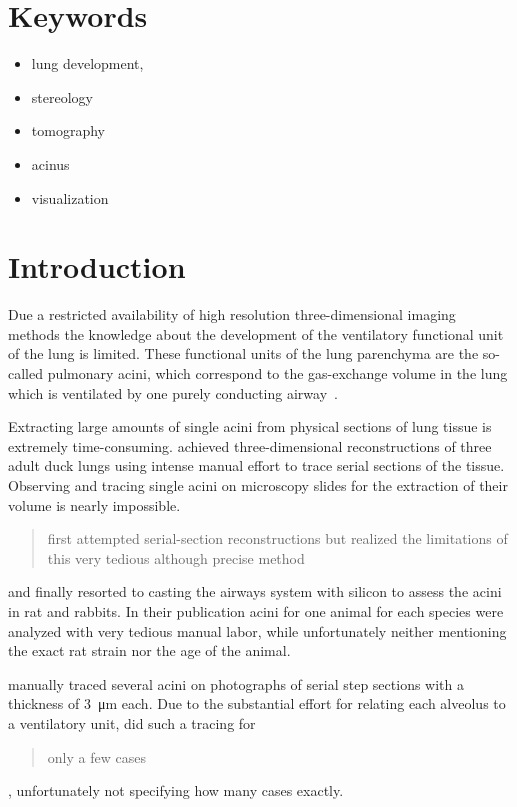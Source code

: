\documentclass[twoside,paper=a4,abstract=true,english,DIV=calc]{scrartcl}
\begin{document}
\section{Keywords}
\begin{itemize}
	\item lung development,
	\item stereology
	\item tomography
	\item acinus
	\item visualization
\end{itemize}
\clearpage
\listoftodos
\clearpage
\tableofcontents

\clearpage
\section{Introduction}
Due a restricted availability of high resolution three-dimensional imaging methods the knowledge about the development of the ventilatory functional unit of the lung is limited.
These functional units of the lung parenchyma are the so-called pulmonary acini, which correspond to the gas-exchange volume in the lung which is ventilated by one purely conducting airway~\cite{Rodriguez1987}.

Extracting large amounts of single acini from physical sections of lung tissue is extremely time-consuming.
\citet{Woodward2005} achieved three-dimensional reconstructions of three adult duck lungs using intense manual effort to trace serial sections of the tissue.
Observing and tracing single acini on microscopy slides for the extraction of their volume is nearly impossible.
\citet{Rodriguez1987} \blockquote{first attempted serial-section reconstructions but realized the limitations of this very tedious although precise method} and finally resorted to casting the airways system with silicon to assess the acini in rat and rabbits.
In their publication acini for one animal for each species were analyzed with very tedious manual labor, while unfortunately neither mentioning the exact rat strain nor the age of the animal.

\citet{Mercer1987a} manually traced several acini on photographs of serial step sections with a thickness of \SI{3}{\micro\meter} each.
Due to the substantial effort for relating each alveolus to a ventilatory unit, \citeauthor{Mercer1987a} did such a tracing for \blockquote{only a few cases}, unfortunately not specifying how many cases exactly.
\end{document}
